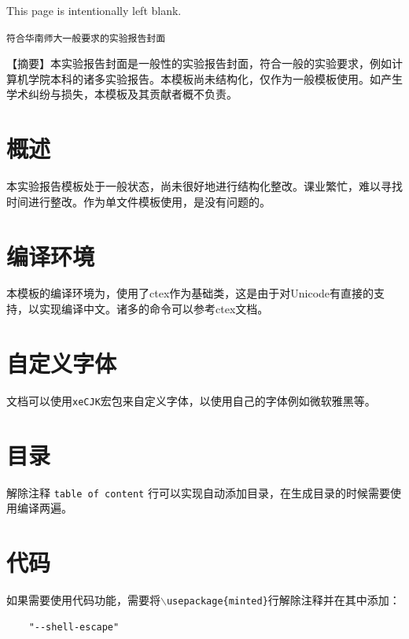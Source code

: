 \documentclass[10.5pt,a4paper,headings]{ctexart}
\newcommand*{\blankpage}{%
\vspace*{\fill}
{\centering\fontsize{32pt}{64pt} This page is intentionally left blank.\par}
\vspace{\fill}}
\begin{document}
\blankpage
\newpage
\tableofcontents

\newpage

\begin{center}
\tt 符合华南师大一般要求的实验报告封面
\end{center}

\setlength{\parindent}{2em}


\onehalfspacing
【摘要】本实验报告封面是一般性的实验报告封面，符合一般的实验要求，例如计算机学院本科的诸多实验报告。本模板尚未结构化，仅作为一般模板使用。如产生学术纠纷与损失，本模板及其贡献者概不负责。

\doublespacing
\section{概述}
本实验报告模板处于一般状态，尚未很好地进行结构化整改。课业繁忙，难以寻找时间进行整改。作为单文件模板使用，是没有问题的。

\section{编译环境}
本模板的编译环境为\XeLaTeX ，使用了ctex作为基础类，这是由于\XeLaTeX 对Unicode有直接的支持，以实现编译中文。诸多的命令可以参考ctex文档。

\section{自定义字体}
文档可以使用\texttt{xeCJK}宏包来自定义字体，以使用自己的字体例如微软雅黑等。

\section{目录}
解除注释 \texttt{table of content} 行可以实现自动添加目录，在生成目录的时候需要使用\XeLaTeX 编译两遍。

\section{代码}
如果需要使用代码功能，需要将\texttt{$\backslash$usepackage\{minted\}}行解除注释并在其中添加：
\begin{verbatim}
    "--shell-escape"
\end{verbatim}
\end{document}

